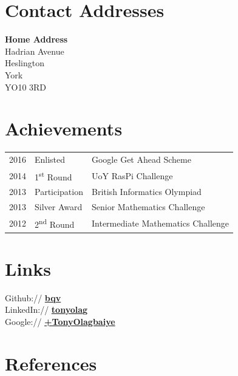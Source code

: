 \documentclass[11pt, a4paper]{cv}
\begin{document}
\begin{minipage}[t]{0.8\textwidth}
\begin{minipage}[t]{0.55\textwidth}
\end{minipage}

\section{Contact Addresses} 

\center\textbf{Home Address} \\
 Hadrian Avenue \\
Heslington \\
York \\
YO10 3RD

\sectionspace %

\section{Achievements} 

\begin{tabular}{rll}
2016 & Enlisted & Google Get Ahead Scheme \\
2014	 & 1\textsuperscript{st} Round & UoY RasPi Challenge\\
2013 & Participation & British Informatics Olympiad \\
2013 & Silver Award & Senior Mathematics Challenge \\
2012 & 2\textsuperscript{nd} Round & Intermediate Mathematics Challenge \\
\end{tabular}

\sectionspace %

\section{Links} 

\faGithub{} Github:// \href{https://github.com/bqv}{\bf bqv} \\
\faLinkedin{} LinkedIn:// \href{https://www.linkedin.com/in/tonyolag}{\bf tonyolag} \\
\faGooglePlus{} Google:// \href{https://plus.google.com/+TonyOlagbaiye}{\bf +TonyOlagbaiye}

\sectionspace %

\section{References}


\end{minipage}
\end{document}
